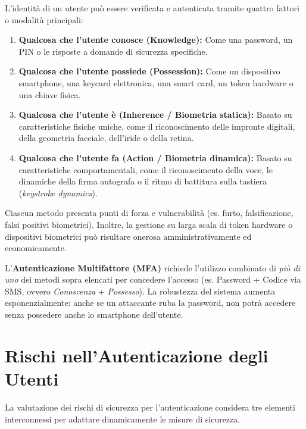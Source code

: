 L'identità di un utente può essere verificata e autenticata tramite quattro fattori o modalità principali:

\begin{enumerate}
    \item \textbf{Qualcosa che l'utente conosce (Knowledge):} Come una password, un PIN o le risposte a domande di sicurezza specifiche.
    \item \textbf{Qualcosa che l'utente possiede (Possession):} Come un dispositivo smartphone, una keycard elettronica, una smart card, un token hardware o una chiave fisica.
    \item \textbf{Qualcosa che l'utente è (Inherence / Biometria statica):} Basato su caratteristiche fisiche uniche, come il riconoscimento delle impronte digitali, della geometria facciale, dell'iride o della retina.
    \item \textbf{Qualcosa che l'utente fa (Action / Biometria dinamica):} Basato su caratteristiche comportamentali, come il riconoscimento della voce, le dinamiche della firma autografa o il ritmo di battitura sulla tastiera (\textit{keystroke dynamics}).
\end{enumerate}

Ciascun metodo presenta punti di forza e vulnerabilità (es. furto, falsificazione, falsi positivi biometrici). Inoltre, la gestione su larga scala di token hardware o dispositivi biometrici può risultare onerosa amministrativamente ed economicamente.

\begin{notebox}
L'\textbf{Autenticazione Multifattore (MFA)} richiede l'utilizzo combinato di \textit{più di uno} dei metodi sopra elencati per concedere l'accesso (es. Password + Codice via SMS, ovvero \textit{Conoscenza} + \textit{Possesso}). 
La robustezza del sistema aumenta esponenzialmente: anche se un attaccante ruba la password, non potrà accedere senza possedere anche lo smartphone dell'utente.
\end{notebox}

\section{Rischi nell'Autenticazione degli Utenti}

La valutazione dei rischi di sicurezza per l'autenticazione considera tre elementi interconnessi per adattare dinamicamente le misure di sicurezza.

